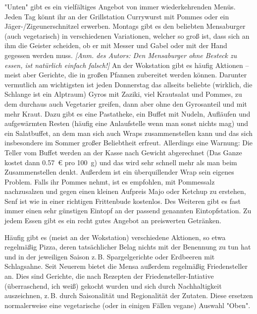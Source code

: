 \begin{multicols*}{2}

"Unten" gibt es ein vielfältiges Angebot von immer wiederkehrenden Menüs.
Jeden Tag könnt ihr an der Grillstation Currywurst mit Pommes oder ein Jäger-/Zigeunerschnitzel erwerben.
Montags gibt es den beliebten Mensaburger (auch vegetarisch) in verschiedenen Variationen, welcher so groß ist, dass sich an ihm die Geister scheiden, ob er mit Messer und Gabel oder mit der Hand gegessen werden muss. \textit{[Anm. des Autors: Den Mensaburger ohne Besteck zu essen, ist natürlich einfach falsch!]}
An der Wokstation gibt es häufig Aktionen – meist aber Gerichte, die in großen Pfannen zubereitet werden können. Darunter vermutlich am wichtigsten ist jeden Donnerstag das allseits beliebte (wirklich, die Schlange ist ein Alptraum) Gyros mit Zaziki, viel Krautsalat und Pommes, zu dem durchaus auch Vegetarier greifen, dann aber ohne den Gyrosanteil und mit mehr Kraut.
Dazu gibt es eine Pastatheke, ein Buffet mit Nudeln, Aufläufen und aufgewärmten Resten (häufig eine Anlaufstelle wenn man sonst nichts mag) und ein Salatbuffet, an dem man sich auch Wraps zusammenstellen kann und das sich insbesondere im Sommer großer Beliebtheit erfreut. Allerdings eine Warnung: Die Teller vom Buffet werden an der Kasse nach Gewicht abgerechnet (Das Ganze kostet dann \SI{0,57}{\euro} pro \SI{100}{\g}) und das wird sehr schnell mehr als man beim Zusammenstellen denkt. Außerdem ist ein überquillender Wrap sein eigenes Problem.
Falls ihr Pommes nehmt, ist es empfohlen, mit Pommessalz nachzusalzen und gegen einen kleinen Aufpreis Majo oder Ketchup zu erstehen, Senf ist wie in einer richtigen Frittenbude kostenlos.
Des Weiteren gibt es fast immer einen sehr günstigen Eintopf an der passend genannten Eintopfstation.
Zu jedem Essen gibt es ein recht gutes Angebot an preiswerten Getränken.

Häufig gibt es (meist an der Wokstation) verschiedene Aktionen, so etwa regelmäßig Pizza, deren tatsächlicher Belag nichts mit der Benennung zu tun hat und in der jeweiligen Saison z.\,B. Spargelgerichte oder Erdbeeren mit Schlagsahne. Seit Neuerem bietet die Mensa außerdem regelmäßig Friedensteller an. Dies sind Gerichte, die nach Rezepten der Friedensteller-Intiative (überraschend, ich weiß) gekocht wurden und sich durch Nachhaltigkeit auszeichnen, z.\,B. durch Saisonalität und Regionalität der Zutaten. Diese ersetzen normalerweise eine vegetarische (oder in einigen Fällen vegane) Auswahl "Oben".


\end{multicols*}
